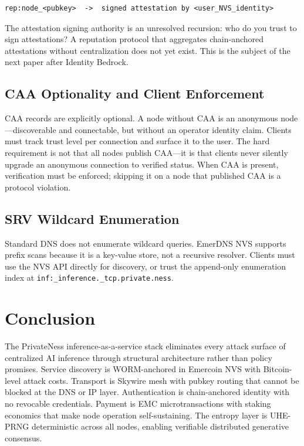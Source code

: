 \documentclass[11pt,a4paper]{article}
\begin{document}
\begin{lstlisting}
rep:node_<pubkey>  ->  signed attestation by <user_NVS_identity>
\end{lstlisting}

The attestation signing authority is an unresolved recursion: who do you trust to sign attestations? A reputation protocol that aggregates chain-anchored attestations without centralization does not yet exist. This is the subject of the next paper after Identity Bedrock.

\subsection{CAA Optionality and Client Enforcement}

CAA records are explicitly optional. A node without CAA is an anonymous node—discoverable and connectable, but without an operator identity claim. Clients must track trust level per connection and surface it to the user. The hard requirement is not that all nodes publish CAA—it is that clients never silently upgrade an anonymous connection to verified status. When CAA is present, verification must be enforced; skipping it on a node that published CAA is a protocol violation.

\subsection{SRV Wildcard Enumeration}

Standard DNS does not enumerate wildcard queries. EmerDNS NVS supports prefix scans because it is a key-value store, not a recursive resolver. Clients must use the NVS API directly for discovery, or trust the append-only enumeration index at \texttt{inf:\_inference.\_tcp.private.ness}.

\section{Conclusion}
\label{sec:conclusion}

The PrivateNess inference-as-a-service stack eliminates every attack surface of centralized AI inference through structural architecture rather than policy promises. Service discovery is WORM-anchored in Emercoin NVS with Bitcoin-level attack costs. Transport is Skywire mesh with pubkey routing that cannot be blocked at the DNS or IP layer. Authentication is chain-anchored identity with no revocable credentials. Payment is EMC microtransactions with staking economics that make node operation self-sustaining. The entropy layer is UHE-PRNG deterministic across all nodes, enabling verifiable distributed generative consensus.
\end{document}
